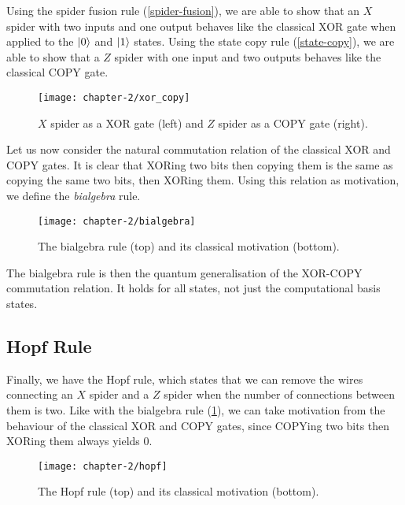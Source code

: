 \vspace{2pt}

Using the spider fusion rule (\ref{spider-fusion}), we are able to show that an $X$ spider with two inputs and one output behaves like the classical XOR gate when applied to the $\ket 0$ and $\ket 1$ states. Using the state copy rule (\ref{state-copy}), we are able to show that a $Z$ spider with one input and two outputs behaves like the classical COPY gate.

\begin{figure}[H]
    \centering
    \texttt{[image: chapter-2/xor\_copy]}
    \caption{$X$ spider as a XOR gate (left) and $Z$ spider as a COPY gate (right).}
\end{figure}

Let us now consider the natural commutation relation of the classical XOR and COPY gates. It is clear that XORing two bits then copying them is the same as copying the same two bits, then XORing them. Using this relation as motivation, we define the \textit{bialgebra} rule.

\begin{figure}[H]
    \centering
    \texttt{[image: chapter-2/bialgebra]}
    \caption{The bialgebra rule (top) and its classical motivation (bottom).}
    \label{bialgebra}
\end{figure}

The bialgebra rule is then the quantum generalisation of the XOR-COPY commutation relation. It holds for all states, not just the computational basis states.


\subsection{Hopf Rule}%
\label{hopf}

Finally, we have the Hopf rule, which states that we can remove the wires connecting an $X$ spider and a $Z$ spider when the number of connections between them is two. Like with the bialgebra rule (\ref{bialgebra}), we can take motivation from the behaviour of the classical XOR and COPY gates, since COPYing two bits then XORing them always yields 0.

\begin{figure}[H]
    \centering
    \texttt{[image: chapter-2/hopf]}
    \caption{The Hopf rule (top) and its classical motivation (bottom).}
\end{figure}

